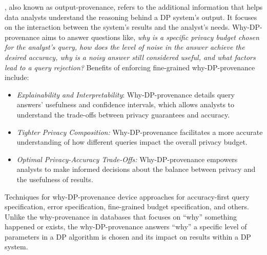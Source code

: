 , also known as output-provenance, refers to the additional information that helps data analysts understand the reasoning behind a DP system's output. It focuses on the interaction between the system's results and the analyst's needs.
Why-DP-provenance aims to answer questions like, \emph{why is a specific privacy budget chosen for the analyst's query, how does the level of noise in the answer achieve the desired accuracy, why is a noisy answer still considered useful, and what factors lead to a query rejection?}
Benefits of enforcing fine-grained why-DP-provenance include:
\begin{itemize}
    \item \emph{Explainability and Interpretability}: Why-DP-provenance details query answers' usefulness and confidence intervals, which allows analysts to understand the trade-offs between privacy guarantees and accuracy.
    \item \emph{Tighter Privacy Composition:} Why-DP-provenance facilitates a more accurate understanding of how different queries impact the overall privacy budget. \item \emph{Optimal Privacy-Accuracy Trade-Offs:} Why-DP-provenance empowers analysts to make informed decisions about the balance between privacy and the usefulness of results. 
\end{itemize}
Techniques for why-DP-provenance device approaches for accuracy-first query specification, error specification, fine-grained budget specification, and others.
Unlike the why-provenance in databases that focuses on ``why'' something happened or exists, the why-DP-provenance answers ``why'' a specific level of parameters in a DP algorithm is chosen and its impact on results within a DP system.





